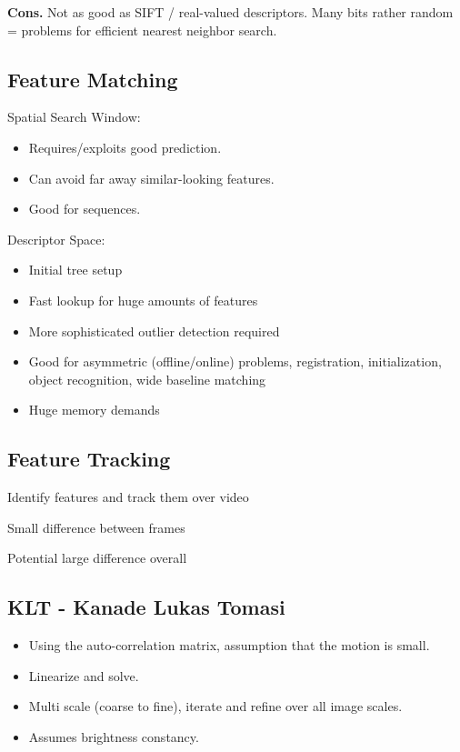 \textbf{Cons.} Not as good as SIFT / real-valued descriptors. Many bits rather random = problems for efficient nearest neighbor search.

\subsection{Feature Matching}

Spatial Search Window:
\begin{itemize}
\item Requires/exploits good prediction.
\item Can avoid far away similar-looking features.
\item Good for sequences.
\end{itemize}

Descriptor Space:
\begin{itemize}
\item Initial tree setup
\item Fast lookup for huge amounts of features
\item More sophisticated outlier detection required
\item Good for asymmetric (offline/online) problems, registration, initialization, object recognition, wide baseline matching
\item Huge memory demands
\end{itemize}

\subsection{Feature Tracking}

Identify features and track them over video

Small difference between frames

Potential large difference overall

\subsection{KLT - Kanade Lukas Tomasi}
\begin{itemize}
\item Using the auto-correlation matrix, assumption that the motion is small.
\item Linearize and solve.
\item Multi scale (coarse to fine), iterate and refine over all image scales.
\item Assumes brightness constancy.
\end{itemize}

